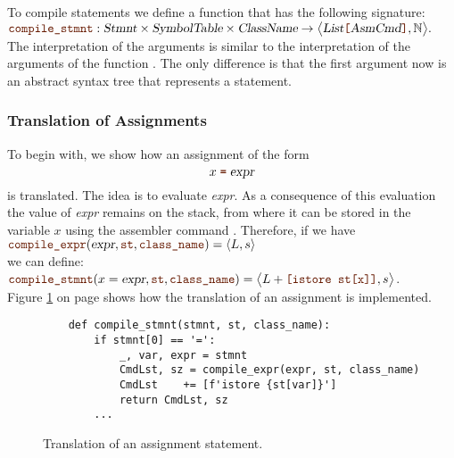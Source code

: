 To compile statements we define a function
 that has the following signature:
\\[0.2cm]
\hspace*{1.3cm}
$\mytt{compile\_stmnt}: \textsl{Stmnt} \times \textsl{SymbolTable} \times \textsl{ClassName} \rightarrow 
                 \bigl\langle\textsl{List}\mytt{[}\textsl{AsmCmd}\mytt{]}, \mathbb{N}\bigr\rangle.$
\\[0.2cm]
The interpretation of the arguments is similar to the interpretation of the arguments
of the function .  The only difference is that the first argument now is an abstract syntax
tree that represents a statement.

\subsubsection{Translation of Assignments}
To begin with, we show how an assignment of the form 
\[ x \;\mytt{=}\; \textsl{expr} \]
is translated.  The idea is to evaluate \textsl{expr}.  As a consequence of this evaluation  the value of
\textsl{expr} remains on the stack, from where it can be stored in the variable $x$ using the assembler command 
. Therefore, if we have
\\[0.2cm]
\hspace*{1.3cm}
$\mytt{compile\_expr}(\textsl{expr}, \mytt{st}, \mytt{class\_name}) = \pair(L, s)$
\\[0.2cm]
we can define:
\\[0.2cm]
\hspace*{1.3cm}
$\mytt{compile\_stmnt}(x = \textsl{expr}, \mytt{st}, \mytt{class\_name})
= \bigl\langle L + \mytt{[istore st[x]]}, s \bigr\rangle $.
\\[0.2cm]
Figure \ref{fig:Compiler.ipynb:compile:assign} on page \pageref{fig:Compiler.ipynb:compile:assign} shows how the
translation of an assignment is implemented.


\begin{figure}[!ht]
\centering
\begin{verbatim}
    def compile_stmnt(stmnt, st, class_name):
        if stmnt[0] == '=':
            _, var, expr = stmnt
            CmdLst, sz = compile_expr(expr, st, class_name)
            CmdLst    += [f'istore {st[var]}']
            return CmdLst, sz                
        ...
\end{verbatim}
\vspace*{-0.3cm}
\caption{Translation of an assignment statement.}
\label{fig:Compiler.ipynb:compile:assign}
\end{figure}





